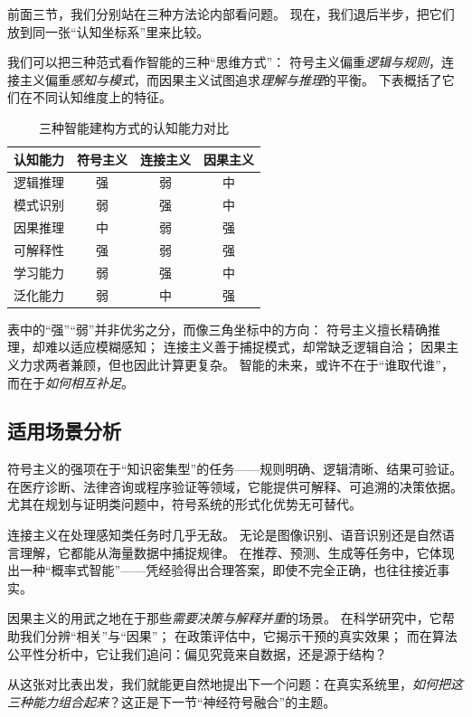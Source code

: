 前面三节，我们分别站在三种方法论内部看问题。  
现在，我们退后半步，把它们放到同一张“认知坐标系”里来比较。

我们可以把三种范式看作智能的三种“思维方式”：  
符号主义偏重\emph{逻辑与规则}，连接主义偏重\emph{感知与模式}，而因果主义试图追求\emph{理解与推理}的平衡。  
下表概括了它们在不同认知维度上的特征。  

\begin{table}[h]
\centering
\caption{三种智能建构方式的认知能力对比}
\begin{tabular}{|l|c|c|c|}
\hline
\textbf{认知能力} & \textbf{符号主义} & \textbf{连接主义} & \textbf{因果主义} \\
\hline
逻辑推理 & 强 & 弱 & 中 \\
模式识别 & 弱 & 强 & 中 \\
因果推理 & 中 & 弱 & 强 \\
可解释性 & 强 & 弱 & 强 \\
学习能力 & 弱 & 强 & 中 \\
泛化能力 & 弱 & 中 & 强 \\
\hline
\end{tabular}
\end{table}

表中的“强”“弱”并非优劣之分，而像三角坐标中的方向：  
符号主义擅长精确推理，却难以适应模糊感知；  
连接主义善于捕捉模式，却常缺乏逻辑自洽；  
因果主义力求两者兼顾，但也因此计算更复杂。  
智能的未来，或许不在于“谁取代谁”，而在于\emph{如何相互补足}。

\subsection{适用场景分析}

符号主义的强项在于“知识密集型”的任务——规则明确、逻辑清晰、结果可验证。  
在医疗诊断、法律咨询或程序验证等领域，它能提供可解释、可追溯的决策依据。  
尤其在规划与证明类问题中，符号系统的形式化优势无可替代。

连接主义在处理感知类任务时几乎无敌。  
无论是图像识别、语音识别还是自然语言理解，它都能从海量数据中捕捉规律。  
在推荐、预测、生成等任务中，它体现出一种“概率式智能”——凭经验得出合理答案，即使不完全正确，也往往接近事实。

因果主义的用武之地在于那些\emph{需要决策与解释并重}的场景。  
在科学研究中，它帮助我们分辨“相关”与“因果”；  
在政策评估中，它揭示干预的真实效果；  
而在算法公平性分析中，它让我们追问：偏见究竟来自数据，还是源于结构？  

从这张对比表出发，我们就能更自然地提出下一个问题：在真实系统里，\emph{如何把这三种能力组合起来}？这正是下一节“神经符号融合”的主题。

